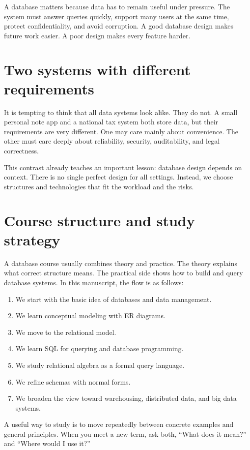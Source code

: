 \documentclass[11pt,a4paper,openany]{book}
\begin{document}
A database  matters because data has to remain useful under pressure. The system must answer queries quickly, support many users at the same time, protect confidentiality, and avoid corruption. A good database design makes future work easier. A poor design makes every feature harder.

\section{Two systems with different requirements}
It is tempting to think that all data systems look alike. They do not. A small personal note app and a national tax system both store data, but their requirements are very different. One may care mainly about convenience. The other must care deeply about reliability, security, auditability, and legal correctness.

This contrast already teaches an important lesson: database design depends on context. There is no single perfect design for all settings. Instead, we choose structures and technologies that fit the workload and the risks.

\section{Course structure and study strategy}
A database course usually combines theory and practice. The theory explains what correct structure means. The practical side shows how to build and query database systems. In this manuscript, the flow is as follows:

\begin{enumerate}
\item We start with the basic idea of databases and data management.
\item We learn conceptual modeling with ER diagrams.
\item We move to the relational model.
\item We learn SQL for querying and database programming.
\item We study relational algebra as a formal query language.
\item We refine schemas with normal forms.
\item We broaden the view toward warehousing, distributed data, and big data systems.
\end{enumerate}

A useful way to study is to move repeatedly between concrete examples and general principles. When you meet a new term, ask both, ``What does it mean?'' and ``Where would I use it?''
\end{document}
